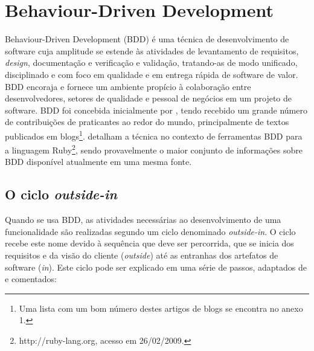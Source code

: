 \documentclass[a4paper,abntfigtabnum,noindentfirst]{abnt}
\date{12 de março de 2010}
\begin{document}
\maketitle

\chapter*{Behaviour-Driven Development}

Behaviour-Driven Development (BDD) é uma técnica de desenvolvimento de software cuja amplitude se estende às atividades de levantamento de requisitos, \textit{design}, documentação e verificação e validação, tratando-as de modo unificado, disciplinado e com foco em qualidade e em entrega rápida de software de valor. BDD encoraja e fornece um ambiente propício à colaboração entre desenvolvedores, setores de qualidade e pessoal de negócios em um projeto de software. BDD foi concebida inicialmente por , tendo recebido um grande número de contribuições de praticantes ao redor do mundo, principalmente de textos publicados em blogs\footnote{Uma lista com um bom número destes artigos de blogs se encontra no anexo 1.}.  detalham a técnica no contexto de ferramentas BDD para a linguagem Ruby\footnote{http://ruby-lang.org, acesso em 26/02/2009.}, sendo provavelmente o maior conjunto de informações sobre BDD disponível atualmente em uma mesma fonte.

\section*{O ciclo \textit{outside-in}}

Quando se usa BDD, as atividades necessárias ao desenvolvimento de uma funcionalidade são realizadas segundo  um ciclo denominado \textit{outside-in}. O ciclo recebe este nome devido à sequência que deve ser percorrida, que se inicia dos requisitos e da visão do cliente (\textit{outside}) até as entranhas dos artefatos de software (\textit{in}). Este ciclo pode ser explicado em uma série de passos, adaptados de  e comentados:
\end{document}
